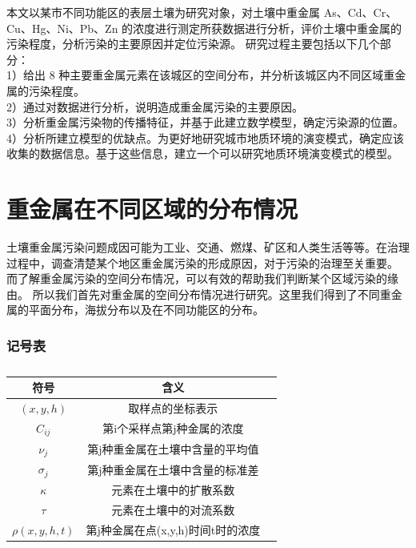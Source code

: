 \documentclass[a4paper]{article}
\begin{document}
\indent 本文以某市不同功能区的表层土壤为研究对象，对土壤中重金属 As、Cd、Cr、
Cu、Hg、Ni、Pb、Zn 的浓度进行测定所获数据进行分析，评价土壤中重金属的污染程度，分析污染的主要原因并定位污染源。
研究过程主要包括以下几个部分：\\
1）给出 8 种主要重金属元素在该城区的空间分布，并分析该城区内不同区域重金属的污染程度。\\
2）通过对数据进行分析，说明造成重金属污染的主要原因。  \\
3）分析重金属污染物的传播特征，并基于此建立数学模型，确定污染源的位置。  \\
4）分析所建立模型的优缺点。为更好地研究城市地质环境的演变模式，确定应该收集的数据信息。基于这些信息，建立一个可以研究地质环境演变模式的模型。  \\

\part{重金属在不同区域的分布情况}
\indent 土壤重金属污染问题成因可能为工业、交通、燃煤、矿区和人类生活等等。在治理过程中，调查清楚某个地区重金属污染的形成原因，对于污染的治理至关重要。
而了解重金属污染的空间分布情况，可以有效的帮助我们判断某个区域污染的缘由。
所以我们首先对重金属的空间分布情况进行研究。这里我们得到了不同重金属的平面分布，海拔分布以及在不同功能区的分布。   \\
\section*{记号表}
\begin{table}[H]
	\centering
	\caption{}
	\label{tab:problem1_symbols}
	\begin{tabular}{ccc}
		\hline
		符号 & 含义  \\
		\hline
		$(x,y,h)$ &取样点的坐标表示   \\
		$C_{ij}$ & 第i个采样点第j种金属的浓度  \\
		$\nu_j$   &  第j种重金属在土壤中含量的平均值  \\
		$\sigma_j$  &   第j种重金属在土壤中含量的标准差 \\
         $\kappa$ & 元素在土壤中的扩散系数      \\
		$\tau$   & 元素在土壤中的对流系数      \\
		$\rho(x,y,h,t)$   & 第j种金属在点(x,y,h)时间t时的浓度 \\	
	\end{tabular} \\
\end{table}
\end{document}
